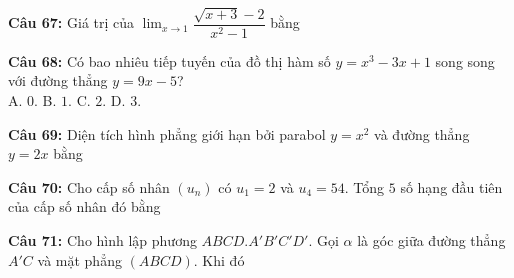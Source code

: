 \documentclass[12pt,a4paper]{article}
\begin{document}


\vspace{0.3cm}

\noindent \textbf{Câu 67:} Giá trị của $\displaystyle\lim_{x\to1}\dfrac{\sqrt{x+3}-2}{x^2-1}$ bằng\\
\noindent{}



\vspace{0.3cm}

\noindent \textbf{Câu 68:} Có bao nhiêu tiếp tuyến của đồ thị hàm số $y=x^3-3x+1$ song song với đường thẳng $y=9x-5$?\\
\noindent A. $0$. \hfill B. $1$. \hfill C. $2$. \hfill D. $3$.



\vspace{0.3cm}

\noindent \textbf{Câu 69:} Diện tích hình phẳng giới hạn bởi parabol $y=x^2$ và đường thẳng $y=2x$ bằng\\
\noindent{}



\vspace{0.3cm}

\noindent \textbf{Câu 70:} Cho cấp số nhân $(u_n)$ có $u_1=2$ và $u_4=54$. Tổng $5$ số hạng đầu tiên của cấp số nhân đó bằng\\
\noindent{}



\vspace{0.3cm}

\noindent \textbf{Câu 71:} Cho hình lập phương $ABCD.A'B'C'D'$. Gọi $\alpha$ là góc giữa đường thẳng $A'C$ và mặt phẳng $(ABCD)$. Khi đó\\
\noindent{}\\[0.25cm]
\noindent{}
\end{document}
